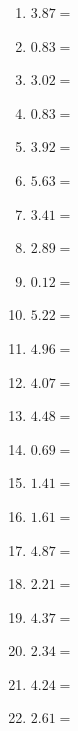 \documentclass[12pt]{article}
\begin{document}
\begin{enumerate}
\item \large $ 3.87 = $ \vspace{1.5cm}
\item \large $ 0.83 = $ \vspace{1.5cm}
\item \large $ 3.02 = $ \vspace{1.5cm}
\item \large $ 0.83 = $ \vspace{1.5cm}
\newpage
\item \large $ 3.92 = $ \vspace{1.5cm}
\item \large $ 5.63 = $ \vspace{1.5cm}
\item \large $ 3.41 = $ \vspace{1.5cm}
\item \large $ 2.89 = $ \vspace{1.5cm}
\item \large $ 0.12 = $ \vspace{1.5cm}
\item \large $ 5.22 = $ \vspace{1.5cm}
\item \large $ 4.96 = $ \vspace{1.5cm}
\item \large $ 4.07 = $ \vspace{1.5cm}
\item \large $ 4.48 = $ \vspace{1.5cm}
\item \large $ 0.69 = $ \vspace{1.5cm}
\newpage
\item \large $ 1.41 = $ \vspace{1.5cm}
\item \large $ 1.61 = $ \vspace{1.5cm}
\item \large $ 4.87 = $ \vspace{1.5cm}
\item \large $ 2.21 = $ \vspace{1.5cm}
\item \large $ 4.37 = $ \vspace{1.5cm}
\item \large $ 2.34 = $ \vspace{1.5cm}
\item \large $ 4.24 = $ \vspace{1.5cm}
\item \large $ 2.61 = $ \vspace{1.5cm}

\end{enumerate}
\end{document}

